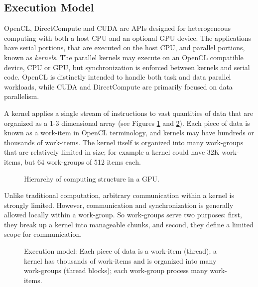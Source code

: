 \documentclass[review]{elsarticle}
\begin{document}
\subsection{Execution Model}

OpenCL, DirectCompute and CUDA are APIs designed for heterogeneous computing with both a host CPU and an optional GPU device. The applications have serial portions, that are executed on the host CPU, and parallel portions, known as \textit{kernels}. The parallel kernels may execute on an OpenCL compatible device, CPU or GPU, but synchronization is enforced between kernels and serial code. OpenCL is distinctly intended to handle both task and data parallel workloads, while CUDA and DirectCompute are primarily focused on data parallelism. 

A kernel applies a single stream of instructions to vast quantities of data that are organized as a 1-3 dimensional array (see Figures \ref{figure:captura1paperCEC} and \ref{figure:grid}). Each piece of data is known as a work-item in OpenCL terminology, and kernels may have hundreds or thousands of work-items. The kernel itself is organized into many work-groups that are relatively limited in size; for example a kernel could have 32K work-items, but 64 work-groups of 512 items each. 

\begin{figure}[!ht]
\centerline{}
\caption{Hierarchy of computing structure in a GPU.}
\label{figure:captura1paperCEC}
\end{figure}

Unlike traditional computation, arbitrary communication within a kernel is strongly limited. However, communication and synchronization is generally allowed locally within a work-group. So work-groups serve two purposes: first, they break up a kernel into manageable chunks, and second, they define a limited scope for communication. 

\begin{figure}[!ht]
\centerline{}
\caption{Execution model: Each piece of data is a work-item (thread); a kernel has thousands of work-items and is organized into many work-groups (thread blocks); each work-group process many work-items.}
\label{figure:grid}
\end{figure}

\end{document}
